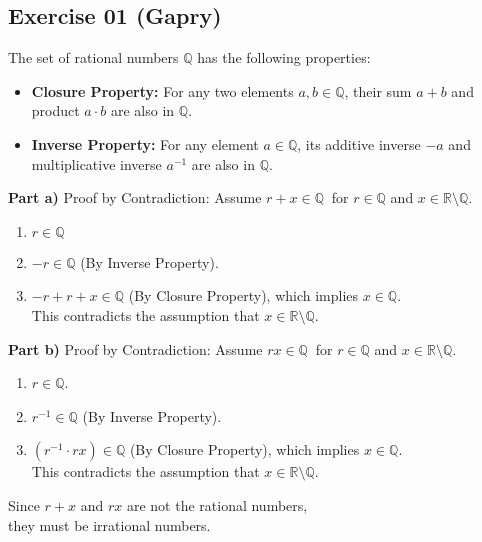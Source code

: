 \subsection*{Exercise 01 (Gapry)}
The set of rational numbers $\mathbb{Q}$ has the following properties:
\begin{itemize}
    \item \textbf{Closure Property:} For any two elements $a, b \in \mathbb{Q}$, their sum $a + b$ and product $a \cdot b$ are also in $\mathbb{Q}$.
    \item \textbf{Inverse Property:} For any element $a \in \mathbb{Q}$, its additive inverse $-a$ and multiplicative inverse $a^{-1}$ are also in $\mathbb{Q}$.
\end{itemize}

\begin{flushleft}
\textbf{Part a)} Proof by Contradiction: Assume $r + x \in \mathbb{Q}\ $ for $r \in \mathbb{Q}$ and $x \in \mathbb{R} \setminus \mathbb{Q}$.
\begin{enumerate}
    \item $r \in \mathbb{Q}$
    \item $-r \in \mathbb{Q}$ (By Inverse Property).
    \item $-r + r + x \in \mathbb{Q}$ (By Closure Property), which implies $x \in \mathbb{Q}$. 
    \\
    This contradicts the assumption that $x \in \mathbb{R} \setminus \mathbb{Q}$.
\end{enumerate}
\end{flushleft}

\begin{flushleft}
\textbf{Part b)} Proof by Contradiction: Assume $rx \in \mathbb{Q}\ $ for $r \in \mathbb{Q}$ and $x \in \mathbb{R} \setminus \mathbb{Q}$.
\begin{enumerate}
    \item $r \in \mathbb{Q}$.
    \item $r^{-1} \in \mathbb{Q}$ (By Inverse Property).
    \item $(r^{-1} \cdot rx) \in \mathbb{Q}$ (By Closure Property), which implies $x \in \mathbb{Q}$. 
    \\
    This contradicts the assumption that $x \in \mathbb{R} \setminus \mathbb{Q}$.
\end{enumerate}
\end{flushleft}

\begin{flushleft}
Since $r + x$ and $rx$ are not the rational numbers, \\
they must be irrational numbers. 
\end{flushleft}
